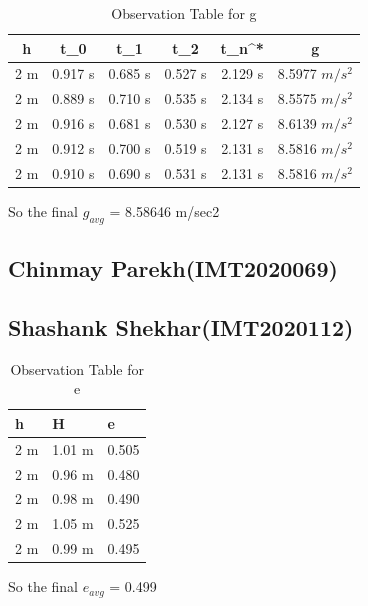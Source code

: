 \documentclass[11pt]{scrartcl} %
\begin{document}
\begin{table}[h]
\centering
\begin{tabular}{||c c c c c c||} 
\toprule
 \hline
 h & t_0 & t_1 & t_2 & t_n^* & g \\ [0.5ex] 
 \midrule
 \hline\hline
 2 m & 0.917 s & 0.685 s  & 0.527 s & 2.129 s & 8.5977 $m/s^2$  \\ 
 \hline
 2 m & 0.889 s & 0.710 s & 0.535 s & 2.134 s & 8.5575 $m/s^2$  \\
 \hline
 2 m & 0.916 s & 0.681 s & 0.530 s & 2.127 s  & 8.6139 $m/s^2$   \\
 \hline
 2 m & 0.912 s & 0.700 s & 0.519 s & 2.131 s  & 8.5816 $m/s^2$   \\
 \hline
 2 m & 0.910 s & 0.690 s & 0.531 s & 2.131 s  & 8.5816 $m/s^2$  \\ [1ex] 
 \bottomrule
 \hline
\end{tabular}
\caption{Observation Table for g}
\end{table}
So the final $g_{avg}$ = 8.58646 m/sec2


\subsection{Chinmay Parekh(IMT2020069)}
\subsection{Shashank Shekhar(IMT2020112)}
\begin{table}[h] %
	\centering %
	\begin{tabular}{l l l}
		\toprule
		\textbf{h} & \textbf{H} & \textbf{e} \\
		\midrule
		2 m & 1.01 m & 0.505\\
        2 m & 0.96 m  & 0.480\\
        2 m & 0.98 m  & 0.490\\
        2 m & 1.05 m & 0.525 \\
        2 m & 0.99 m & 0.495 \\
		\bottomrule
	\end{tabular}
	\caption{Observation Table for e}
\end{table}
So the final $e_{avg}$ = 0.499
\end{document}
